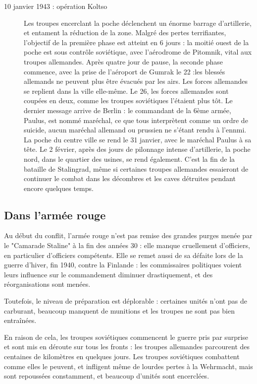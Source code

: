 \documentclass{report}
\begin{document}
\begin{multicols}{2}
\begin{description}
\item[10 janvier 1943 : opération Koltso] Les troupes encerclant la poche déclenchent un énorme barrage d'artillerie, et entament la réduction de la zone. Malgré des pertes terrifiantes, l'objectif de la première phase est atteint en 6 jours : la moitié ouest de la poche est sous contrôle soviétique, avec l'aérodrome de Pitomnik, vital aux troupes allemandes. Après quatre jour de pause, la seconde phase commence, avec la prise de l'aéroport de Gumrak le 22 :les blessés allemands ne peuvent plus être évacués par les airs. Les forces allemandes se replient dans la ville elle-même. Le 26, les forces allemandes sont coupées en deux, comme les troupes soviétiques l'étaient plus tôt. Le dernier message arrive de Berlin : le commandant de la 6ème armée, Paulus, est nommé maréchal, ce que tous interprètent comme un ordre de suicide, aucun maréchal allemand ou prussien ne s'étant rendu à l'ennmi. La poche du centre ville se rend le 31 janvier, avec le maréchal Paulus à sa tête. Le 2 février, après des jours de pilonnage intense d'artillerie, la poche nord, dans le quartier des usines, se rend également. C'est la fin de la bataille de Stalingrad, même si certaines troupes allemandes essaieront de continuer le combat dans les décombres et les caves détruites pendant encore quelques temps.
\end{description}
\subsection{Dans l'armée rouge}
Au début du conflit, l'armée rouge n'est pas remise des grandes purges menée par le "Camarade Staline" à la fin des années 30 : elle manque cruellement d'officiers, en particulier d'officiers compétents. Elle se remet aussi de sa défaite lors de la guerre d'hiver, fin 1940, contre la Finlande : les commissaires politiques voient leurs influence sur le commandement diminuer drastiquement, et des réorganisations sont menées.

Toutefois, le niveau de préparation est déplorable : certaines unités n'ont pas de carburant, beaucoup manquent de munitions et les troupes ne sont pas bien entraînées. 


En raison de cela, les troupes soviétiques commencent le guerre pris par surprise et sont mis en déroute sur tous les fronts : les troupes allemandes parcourent des centaines de kilomètres en quelques jours. Les troupes soviétiques combattent comme elles le peuvent, et infligent même de lourdes pertes à la Wehrmacht, mais sont repoussées constamment, et beaucoup d'unités sont encerclées. 


\end{multicols}
\end{document}

